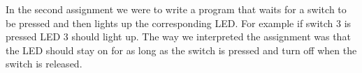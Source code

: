 In the second assignment we were to write a program that waits for a switch
to be pressed and then lights up the corresponding LED. For example if switch 3
is pressed LED 3 should light up. The way we interpreted the assignment was
that the LED should stay on for as long as the switch is pressed and turn off
when the switch is released.
